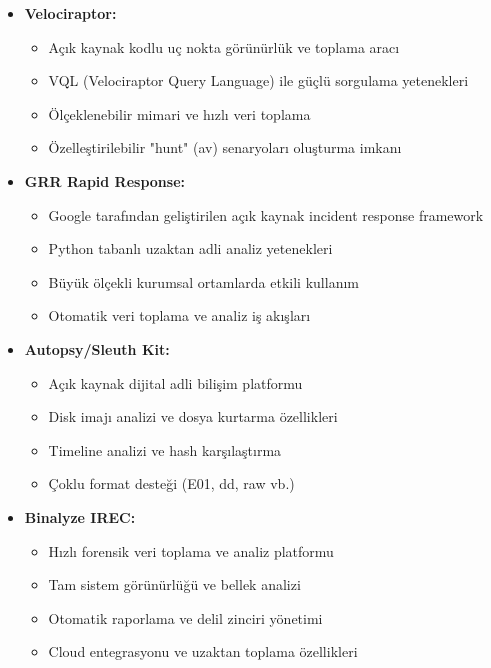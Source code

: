 \begin{itemize}
    \item \textbf{Velociraptor:}
    \begin{itemize}
        \item Açık kaynak kodlu uç nokta görünürlük ve toplama aracı
        \item VQL (Velociraptor Query Language) ile güçlü sorgulama yetenekleri
        \item Ölçeklenebilir mimari ve hızlı veri toplama
        \item Özelleştirilebilir "hunt" (av) senaryoları oluşturma imkanı
    \end{itemize}

    \item \textbf{GRR Rapid Response:}
    \begin{itemize}
        \item Google tarafından geliştirilen açık kaynak incident response framework
        \item Python tabanlı uzaktan adli analiz yetenekleri
        \item Büyük ölçekli kurumsal ortamlarda etkili kullanım
        \item Otomatik veri toplama ve analiz iş akışları
    \end{itemize}

    \item \textbf{Autopsy/Sleuth Kit:}
    \begin{itemize}
        \item Açık kaynak dijital adli bilişim platformu
        \item Disk imajı analizi ve dosya kurtarma özellikleri
        \item Timeline analizi ve hash karşılaştırma
        \item Çoklu format desteği (E01, dd, raw vb.)
    \end{itemize}

    \item \textbf{Binalyze IREC:}
    \begin{itemize}
        \item Hızlı forensik veri toplama ve analiz platformu
        \item Tam sistem görünürlüğü ve bellek analizi
        \item Otomatik raporlama ve delil zinciri yönetimi
        \item Cloud entegrasyonu ve uzaktan toplama özellikleri
    \end{itemize}


\end{itemize}
